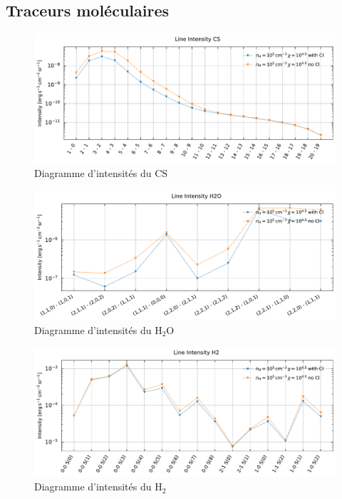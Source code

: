 \begin{appendices}
\clearpage
\subsection*{Traceurs moléculaires}


\begin{figure}[!h]
        \centering \includegraphics[trim = {0 0 0 1cm},clip,width=1\textwidth]{figure/Cl/gridModelEmiss/I_comp_CS.pdf}
        \caption{Diagramme d'intensités du $\mathrm{CS}$}
        \label{fig:cl:emiss:CS}
\end{figure}

\begin{figure}[!h]
        \centering \includegraphics[trim = {0 0 0 1cm},clip,width=1\textwidth]{figure/Cl/gridModelEmiss/I_comp_H2O.pdf}
        \caption{Diagramme d'intensités du $\mathrm{H}_2\mathrm{O}$}
        \label{fig:cl:emiss:H2O}
\end{figure}

\begin{figure}[!h]
        \centering \includegraphics[trim = {0 0 0 1cm},clip,width=1\textwidth]{figure/Cl/gridModelEmiss/I_comp_H2.pdf}
        \caption{Diagramme d'intensités du $\mathrm{H}_2$}
        \label{fig:cl:emiss:H2}
\end{figure}


\end{appendices}

